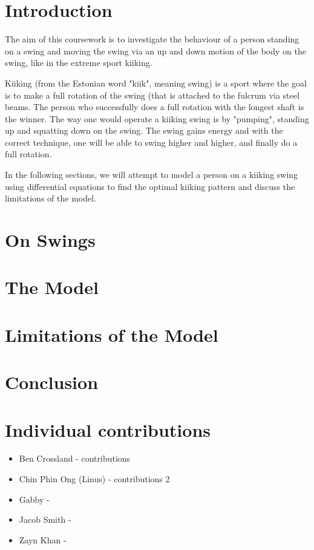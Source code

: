 \documentclass[12pt]{article}
\begin{document}
\begin{abstract}
\end{abstract}

\newpage

\section{Introduction}
The aim of this coursework is to investigate the behaviour of a person standing on a swing and moving the swing via an up and down motion of the body on the swing, like in the extreme sport kiiking.

Kiiking (from the Estonian word "kiik", meaning swing) is a sport where the goal is to make a full rotation of the swing (that is attached to the fulcrum via steel beams. The person who successfully does a full rotation with the longest shaft is the winner. The way one would operate a kiiking swing is by "pumping", standing up and squatting down on the swing. The swing gains energy and with the correct technique, one will be able to swing higher and higher, and finally do a full rotation.

In the following sections, we will attempt to model a person on a kiiking swing using differential equations to find the optimal kiiking pattern and discuss the limitations of the model. %

\section{On Swings}


\section{The Model}

\section{Limitations of the Model}

\section{Conclusion}

\section{Individual contributions}
\begin{itemize}
    \item Ben Crossland - contributions
    \item Chin Phin Ong (Linus) - contributions 2
    \item Gabby -
    \item Jacob Smith -
    \item Zayn Khan -
\end{itemize}
\end{document}
